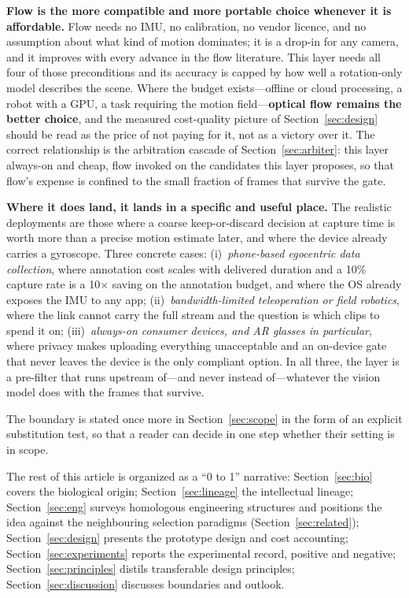 \documentclass[12pt,a4paper]{article}
\begin{document}
\textbf{Flow is the more compatible and more portable choice whenever it is affordable.} Flow needs no IMU, no calibration, no vendor licence, and no assumption about what kind of motion dominates; it is a drop-in for any camera, and it improves with every advance in the flow literature. This layer needs all four of those preconditions and its accuracy is capped by how well a rotation-only model describes the scene. Where the budget exists---offline or cloud processing, a robot with a GPU, a task requiring the motion field---\textbf{optical flow remains the better choice}, and the measured cost-quality picture of Section~\ref{sec:design} should be read as the price of not paying for it, not as a victory over it. The correct relationship is the arbitration cascade of Section~\ref{sec:arbiter}: this layer always-on and cheap, flow invoked on the candidates this layer proposes, so that flow's expense is confined to the small fraction of frames that survive the gate.

\textbf{Where it does land, it lands in a specific and useful place.} The realistic deployments are those where a coarse keep-or-discard decision at capture time is worth more than a precise motion estimate later, and where the device already carries a gyroscope. Three concrete cases: (i)~\emph{phone-based egocentric data collection}, where annotation cost scales with delivered duration and a 10\% capture rate is a 10$\times$ saving on the annotation budget, and where the OS already exposes the IMU to any app; (ii)~\emph{bandwidth-limited teleoperation or field robotics}, where the link cannot carry the full stream and the question is which clips to spend it on; (iii)~\emph{always-on consumer devices, and AR glasses in particular}, where privacy makes uploading everything unacceptable and an on-device gate that never leaves the device is the only compliant option. In all three, the layer is a pre-filter that runs upstream of---and never instead of---whatever the vision model does with the frames that survive.

The boundary is stated once more in Section~\ref{sec:scope} in the form of an explicit substitution test, so that a reader can decide in one step whether their setting is in scope.

The rest of this article is organized as a ``0 to 1'' narrative: Section~\ref{sec:bio} covers the biological origin; Section~\ref{sec:lineage} the intellectual lineage; Section~\ref{sec:eng} surveys homologous engineering structures and positions the idea against the neighbouring selection paradigms (Section~\ref{sec:related}); Section~\ref{sec:design} presents the prototype design and cost accounting; Section~\ref{sec:experiments} reports the experimental record, positive and negative; Section~\ref{sec:principles} distils transferable design principles; Section~\ref{sec:discussion} discusses boundaries and outlook.
\end{document}

